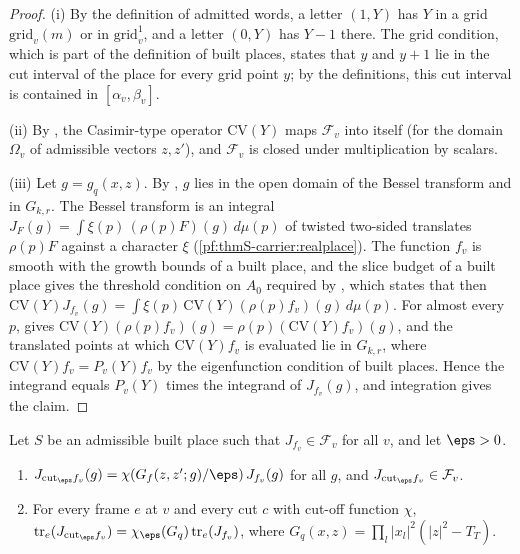 \begin{proof}
(i) By the definition of admitted words, a letter $(1,Y)$ has $Y$ in a grid $\mathrm{grid}_v(m)$ or in $\mathrm{grid}^1_v$,
and a letter $(0,Y)$ has $Y-1$ there. The grid condition, which is part of the definition of built places, states that
$y$ and $y+1$ lie in the cut interval of the place for every grid point $y$; by the definitions, this cut interval is
contained in $[\alpha_v,\beta_v]$.

(ii) By , the Casimir-type operator $\mathrm{CV}(Y)$
maps $\mathcal F_v$ into itself (for the domain $\Omega_v$ of admissible vectors $z,z'$), and $\mathcal F_v$ is closed under
multiplication by scalars.

(iii) Let $g=g_q(x,z)$. By , $g$ lies in the open domain of the
Bessel transform and in $G_{k,r}$. The Bessel transform is an integral $J_F(g)=\int\xi(p)\,(\rho(p)F)(g)\,d\mu(p)$ of
twisted two-sided translates $\rho(p)F$ against a character $\xi$ (\cref{pf:thmS-carrier:realplace}). The function $f_v$ is
smooth with the growth bounds of a built place, and the slice budget of a built place gives the threshold condition on
$A_0$ required by , which states that then
$\mathrm{CV}(Y)J_{f_v}(g)=\int\xi(p)\,\mathrm{CV}(Y)(\rho(p)f_v)(g)\,d\mu(p)$. For almost every $p$,
 gives $\mathrm{CV}(Y)(\rho(p)f_v)(g)=\rho(p)(\mathrm{CV}(Y)f_v)(g)$,
and the translated points at which $\mathrm{CV}(Y)f_v$ is evaluated lie in $G_{k,r}$, where $\mathrm{CV}(Y)f_v=P_v(Y)f_v$ by
the eigenfunction condition of built places. Hence the integrand equals $P_v(Y)$ times the integrand of $J_{f_v}(g)$, and
integration gives the claim.
\end{proof}

\begin{lemma}\label{pf:thmS-carrier:cutofflemma}
Let $S$ be an admissible built place such that $J_{f_v}\in\mathcal F_v$ for all $v$, and let $\eps>0$.
\begin{enumerate}[label=(\roman*)]
\item $J_{\mathrm{cut}_\eps f_v}(g)=\chi(G_f(z,z';g)/\eps)\,J_{f_v}(g)$ for all $g$, and $J_{\mathrm{cut}_\eps f_v}\in
  \mathcal F_v$.
\item For every frame $e$ at $v$ and every cut $c$ with cut-off function $\chi$,
  $\mathrm{tr}_e(J_{\mathrm{cut}_\eps f_v})=\chi_\eps(G_q)\,\mathrm{tr}_e(J_{f_v})$, where $G_q(x,z)=\prod_l|x_l|^2(|z|^2-T_T)$.
\end{enumerate}
\end{lemma}

